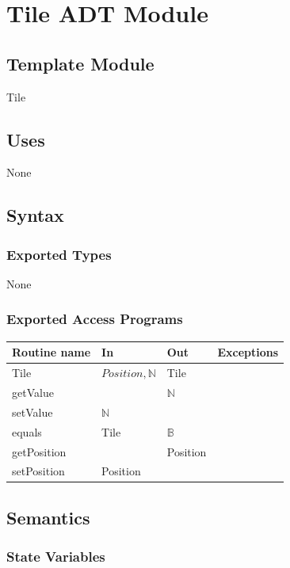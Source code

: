 \documentclass[12pt]{article}
\begin{document}
\newpage

\section* {Tile ADT Module}

\subsection* {Template Module}

Tile

\subsection* {Uses}

None

\subsection* {Syntax}

\subsubsection* {Exported Types}

None

\subsubsection* {Exported Access Programs}

\begin{tabular}{| l | l | l | l |}
\hline
\textbf{Routine name} & \textbf{In} & \textbf{Out} & \textbf{Exceptions}\\
\hline
Tile & $Position, \mathbb{N}$ & Tile & \\
\hline
getValue & ~ & $\mathbb{N}$ & \\
\hline
setValue & $\mathbb{N}$ & ~ & \\
\hline
equals & Tile & $\mathbb{B}$ & ~\\
\hline
getPosition & ~ & Position & \\
\hline
setPosition & Position & ~ & \\
\hline
\end{tabular}

\subsection* {Semantics}

\subsubsection* {State Variables}
\end{document}
